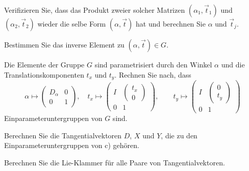 \begin{teilaufgaben}
\item
Verifizieren Sie, dass das Produkt zweier solcher Matrizen 
$(\alpha_1,\vec{t}_1)$ und $(\alpha_2,\vec{t}_2)$
wieder die selbe Form $(\alpha,\vec{t})$ hat und berechnen Sie
$\alpha$ und $\vec{t}_j$.
\item
Bestimmen Sie das inverse Element zu $(\alpha,\vec{t}) \in G$.
\item
Die Elemente der Gruppe $G$ sind parametrisiert durch den Winkel $\alpha$
und die Translationskomponenten $t_x$ und $t_y$.
Rechnen Sie nach, dass
\[
\alpha\mapsto \begin{pmatrix} D_{\alpha}&0\\0&1\end{pmatrix},
\quad
t_x\mapsto
\begin{pmatrix} I&\begin{pmatrix}t_x\\0\end{pmatrix}\\0&1\end{pmatrix},
\qquad
t_y\mapsto
\begin{pmatrix} I&\begin{pmatrix}0\\t_y\end{pmatrix}\\0&1\end{pmatrix}
\]
Einparameteruntergruppen von $G$ sind.
\item
Berechnen Sie die Tangentialvektoren $D$, $X$ und $Y$,
die zu den Einparameteruntergruppen von c) gehören.
\item
Berechnen Sie die Lie-Klammer für alle Paare von Tangentialvektoren.
\end{teilaufgaben}

